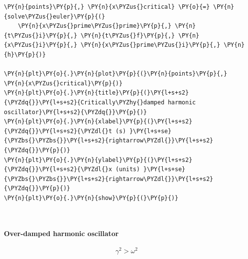     \begin{tcolorbox}[breakable, size=fbox, boxrule=1pt, pad at break*=1mm,colback=cellbackground, colframe=cellborder]
\begin{Verbatim}[commandchars=\\\{\}]
\PY{n}{points}\PY{p}{,} \PY{n}{x\PYZus{}critical} \PY{o}{=} \PY{n}{solve\PYZus{}euler}\PY{p}{(}
    \PY{n}{x\PYZus{}prime\PYZus{}prime}\PY{p}{,} \PY{n}{t\PYZus{}i}\PY{p}{,} \PY{n}{t\PYZus{}f}\PY{p}{,} \PY{n}{x\PYZus{}i}\PY{p}{,} \PY{n}{x\PYZus{}prime\PYZus{}i}\PY{p}{,} \PY{n}{h}\PY{p}{)}

\PY{n}{plt}\PY{o}{.}\PY{n}{plot}\PY{p}{(}\PY{n}{points}\PY{p}{,} \PY{n}{x\PYZus{}critical}\PY{p}{)}
\PY{n}{plt}\PY{o}{.}\PY{n}{title}\PY{p}{(}\PY{l+s+s2}{\PYZdq{}}\PY{l+s+s2}{Critically\PYZhy{}damped harmonic oscillator}\PY{l+s+s2}{\PYZdq{}}\PY{p}{)}
\PY{n}{plt}\PY{o}{.}\PY{n}{xlabel}\PY{p}{(}\PY{l+s+s2}{\PYZdq{}}\PY{l+s+s2}{\PYZdl{}t (s) }\PY{l+s+se}{\PYZbs{}\PYZbs{}}\PY{l+s+s2}{rightarrow\PYZdl{}}\PY{l+s+s2}{\PYZdq{}}\PY{p}{)}
\PY{n}{plt}\PY{o}{.}\PY{n}{ylabel}\PY{p}{(}\PY{l+s+s2}{\PYZdq{}}\PY{l+s+s2}{\PYZdl{}x (units) }\PY{l+s+se}{\PYZbs{}\PYZbs{}}\PY{l+s+s2}{rightarrow\PYZdl{}}\PY{l+s+s2}{\PYZdq{}}\PY{p}{)}
\PY{n}{plt}\PY{o}{.}\PY{n}{show}\PY{p}{(}\PY{p}{)}
\end{Verbatim}
\end{tcolorbox}

    \begin{center}
    \end{center}
    { \hspace*{\fill} \\}
    
    \hypertarget{over-damped-harmonic-oscillator}{%
\paragraph{Over-damped harmonic
oscillator}\label{over-damped-harmonic-oscillator}}

\[\gamma^2 > \omega^2\]

